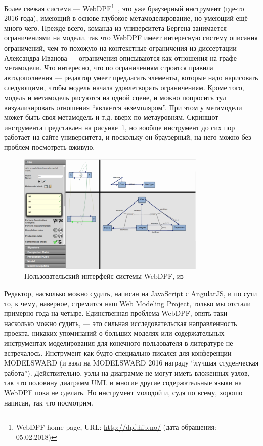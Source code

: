 \documentclass[a5paper]{article}
\begin{document}
Более свежая система --- WebDPF\footnote{WebDPF home page, URL: \url{http://dpf.hib.no/} (дата обращения: 05.02.2018)}~\cite{rabbi2016webdpf}, это уже браузерный инструмент (где-то 2016 года), имеющий в основе глубокое метамоделирование, но умеющий ещё много чего. Прежде всего, команда из университета Бергена занимается ограничениями на модели, так что WebDPF имеет интересную систему описания ограничений, чем-то похожую на контекстные ограничения из диссертации Александра Иванова --- ограничения описываются как отношения на графе метамодели. Что интересно, что по ограничениям строятся правила автодополнения --- редактор умеет предлагать элементы, которые надо нарисовать следующими, чтобы модель начала удовлетворять ограничениям. Кроме того, модель и метамодель рисуются на одной сцене, и можно попросить тул визуализировать отношения ``является экземпляром''. При этом у метамодели может быть своя метамодель и т.д. вверх по метауровням. Скриншот инструмента представлен на рисунке~\ref{figure:webdpf}, но вообще инструмент до сих пор работает на сайте университета, и поскольку он браузерный, на него можно без проблем посмотреть вживую.

\begin{figure}
	\begin{center}
		\includegraphics[width=0.8\textwidth]{webdpf.png}
	\end{center}
	\caption{Пользовательский интерфейс системы WebDPF, из~\cite{rabbi2016webdpf}}
	\label{figure:webdpf}
\end{figure}

Редактор, насколько можно судить, написан на JavaScript с AngularJS, и по сути то, к чему, наверное, стремится наш Web Modeling Project, только мы отстали примерно года на четыре. Единственная проблема WebDPF, опять-таки насколько можно судить, --- это сильная исследовательская направленность проекта, никаких упоминаний о больших моделях или содержательных инструментах моделирования для конечного пользователя в литературе не встречалось. Инструмент как будто специально писался для конференции MODELSWARD (и взял на MODELSWARD 2016 награду ``лучшая студенческая работа''). Действительно, узлы на диаграмме не могут иметь вложенных узлов, так что половину диаграмм UML и многие другие содержательные языки на WebDPF пока не сделать. Но инструмент молодой и, судя по всему, хорошо написан, так что посмотрим.
\end{document}
